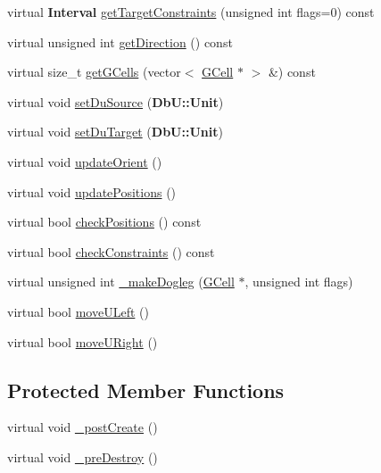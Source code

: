 \begin{DoxyCompactItemize}
\item 
virtual {\bf Interval} \hyperlink{classKatabatic_1_1AutoVertical_aaa70ba865e312fb30f81fa7f973a0376}{get\-Target\-Constraints} (unsigned int flags=0) const 
\item 
virtual unsigned int \hyperlink{classKatabatic_1_1AutoVertical_a09d03fbca9ab891c2f25bdae7f89a899}{get\-Direction} () const 
\item 
virtual size\-\_\-t \hyperlink{classKatabatic_1_1AutoVertical_ab681dca7dc930e06cacc2de85bf99166}{get\-G\-Cells} (vector$<$ \hyperlink{classKatabatic_1_1GCell}{G\-Cell} $\ast$ $>$ \&) const 
\item 
virtual void \hyperlink{classKatabatic_1_1AutoVertical_a756616a1967c5ad8efd08be96d18f25d}{set\-Du\-Source} ({\bf Db\-U\-::\-Unit})
\item 
virtual void \hyperlink{classKatabatic_1_1AutoVertical_a9df2ef68c1fbf4159cc837be5c699b53}{set\-Du\-Target} ({\bf Db\-U\-::\-Unit})
\item 
virtual void \hyperlink{classKatabatic_1_1AutoVertical_a59058f4593049c583c5b3698ff81b299}{update\-Orient} ()
\item 
virtual void \hyperlink{classKatabatic_1_1AutoVertical_a9662a77c2ed8553d6a0312c5292060ad}{update\-Positions} ()
\item 
virtual bool \hyperlink{classKatabatic_1_1AutoVertical_acfbdc94b1e84bd192087df53ead1f06f}{check\-Positions} () const 
\item 
virtual bool \hyperlink{classKatabatic_1_1AutoVertical_a46576c7c5c5146f8fa53a821b0766994}{check\-Constraints} () const 
\item 
virtual unsigned int \hyperlink{classKatabatic_1_1AutoVertical_a36c0eecad40d3559b5378caefec6a7e0}{\-\_\-make\-Dogleg} (\hyperlink{classKatabatic_1_1GCell}{G\-Cell} $\ast$, unsigned int flags)
\item 
virtual bool \hyperlink{classKatabatic_1_1AutoVertical_a1fa2421b74bf0eb934b7002fd3da2321}{move\-U\-Left} ()
\item 
virtual bool \hyperlink{classKatabatic_1_1AutoVertical_aa469e37853e31f8b1bc817518c896d62}{move\-U\-Right} ()
\end{DoxyCompactItemize}
\subsection*{Protected Member Functions}
\begin{DoxyCompactItemize}
\item 
virtual void \hyperlink{classKatabatic_1_1AutoVertical_a3715b38135ca24745f610bebd3407c10}{\-\_\-post\-Create} ()
\item 
virtual void \hyperlink{classKatabatic_1_1AutoVertical_a7c13d9795eafd477994961f8a0d962d0}{\-\_\-pre\-Destroy} ()
\end{DoxyCompactItemize}
